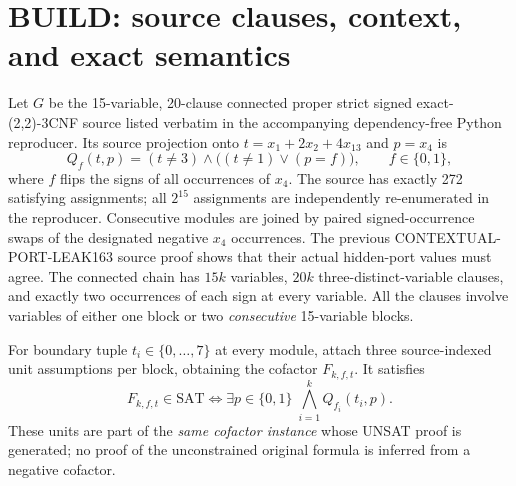\documentclass[11pt]{article}
\begin{document}
\section{BUILD: source clauses, context, and exact semantics}
Let $G$ be the 15-variable, 20-clause connected proper strict signed exact-(2,2)-3CNF source listed verbatim in the accompanying dependency-free Python reproducer. Its source projection onto $t=x_1+2x_2+4x_{13}$ and $p=x_4$ is
\begin{equation}
 Q_f(t,p)=(t\ne3)\land\big((t\ne1)\lor (p=f)\big),\qquad f\in\{0,1\},
 \label{eq:Q}
\end{equation}
where $f$ flips the signs of all occurrences of $x_4$. The source has exactly 272 satisfying assignments; all $2^{15}$ assignments are independently re-enumerated in the reproducer. Consecutive modules are joined by paired signed-occurrence swaps of the designated negative $x_4$ occurrences. The previous CONTEXTUAL-PORT-LEAK163 source proof shows that their actual hidden-port values must agree. The connected chain has $15k$ variables, $20k$ three-distinct-variable clauses, and exactly two occurrences of each sign at every variable. All the clauses involve variables of either one block or two \emph{consecutive} 15-variable blocks.

For boundary tuple $t_i\in\{0,\ldots,7\}$ at every module, attach three source-indexed unit assumptions per block, obtaining the cofactor $F_{k,f,t}$. It satisfies
\begin{equation}
 F_{k,f,t}\in\mathrm{SAT}\iff
 \exists p\in\{0,1\}\;\bigwedge_{i=1}^k Q_{f_i}(t_i,p).
\end{equation}
These units are part of the \emph{same cofactor instance} whose UNSAT proof is generated; no proof of the unconstrained original formula is inferred from a negative cofactor.
\end{document}
